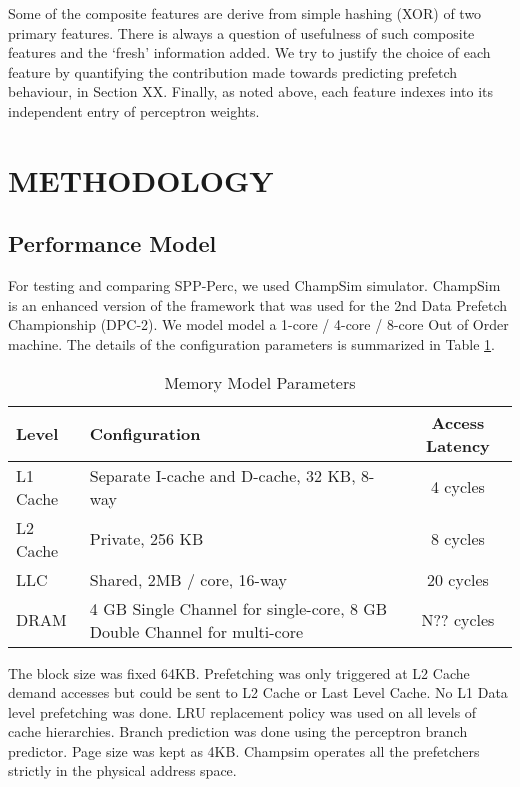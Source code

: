 \documentclass{sig-alternate}
\begin{document}
Some of the composite features are derive from simple hashing (XOR) of two primary features.
There is always a question of usefulness of such composite features and the `fresh' information added.
We try to justify the choice of each feature by quantifying the contribution made towards predicting prefetch behaviour, in Section XX.
Finally, as noted above, each feature indexes into its independent entry of perceptron weights.


\section{METHODOLOGY}
\subsection{Performance Model}
For testing and comparing SPP-Perc, we used ChampSim\cite{Champsim} simulator. 
ChampSim is an enhanced version of the framework that was used for the 2nd Data Prefetch Championship (DPC-2).\cite{DPC_2} 
We model model a 1-core / 4-core / 8-core Out of Order machine. The details of the configuration parameters is summarized in Table  \ref{tab:Sim_params}.

\begin{table}[]
    \centering
    \begin{tabular}{|l|p{3.6cm}|c|}
    \hline
    Level & Configuration & Access Latency \\
    \hline
         L1 Cache & Separate I-cache and D-cache, 32 KB, 8-way & 4 cycles\\
         L2 Cache & Private, 256 KB & 8 cycles\\
         LLC & Shared, 2MB / core, 16-way & 20 cycles\\
         DRAM & 4 GB Single Channel for single-core, 8 GB Double Channel for multi-core & N?? cycles\\
    \hline
    \end{tabular}
    \caption{Memory Model Parameters}
    \label{tab:Sim_params}
\end{table}

The block size was fixed 64KB. Prefetching was only triggered at L2 Cache demand accesses but could be sent to L2 Cache or Last Level Cache. 
No L1 Data level prefetching was done. 
LRU replacement policy was used on all levels of cache hierarchies. 
Branch prediction was done using the perceptron branch predictor\cite{Perc_Branch}. 
Page size was kept as 4KB. 
Champsim operates all the prefetchers strictly in the physical address space.
\end{document}
